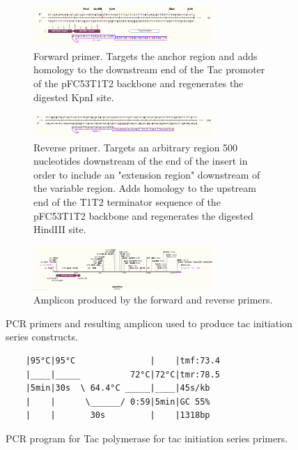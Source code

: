 \documentclass[11pt]{article}
\begin{document}
\begin{figure}[H]
	\centering
	\begin{subfigure}[b]{\textwidth}
		\centering
		\includegraphics[width=0.75\textwidth]{images/primers/t7-init-forward.png}
		\caption{Forward primer. Targets the anchor region and adds homology to the downstream end of the Tac promoter of the pFC53T1T2 backbone and regenerates the digested KpnI site.}
		\label{fig:y equals x}
	\end{subfigure}
	\vfill
	\begin{subfigure}[b]{\textwidth}
		\centering
		\includegraphics[width=0.75\textwidth]{images/primers/t7-init-reverse.png}
		\caption{Reverse primer. Targets an arbitrary region 500 nucleotides downstream of the end of the insert in order to include an "extension region" downstream of the variable region. Adds homology to the upstream end of the T1T2 terminator sequence of the pFC53T1T2 backbone and regenerates the digested HindIII site.}
		\label{fig:three sin x}
	\end{subfigure}
	\vfill
	\begin{subfigure}[b]{\textwidth}
		\centering
		\includegraphics[width=0.75\textwidth]{images/primers/t7-init-amplicon.png}
		\caption{Amplicon produced by the forward and reverse primers.}
		\label{fig:three sin x}
	\end{subfigure}
	\caption{PCR primers and resulting amplicon used to produce tac initiation series constructs.}
\end{figure}


\begin{figure}[H]
	\centering
	\begin{BVerbatim}
	|95°C|95°C               |    |tmf:73.4
	|____|_____          72°C|72°C|tmr:78.5
	|5min|30s  \ 64.4°C _____|____|45s/kb
	|    |      \______/ 0:59|5min|GC 55%
	|    |       30s         |    |1318bp
	\end{BVerbatim}
	\caption{PCR program for Tac polymerase for tac initiation series primers.}
\end{figure}
\end{document}
